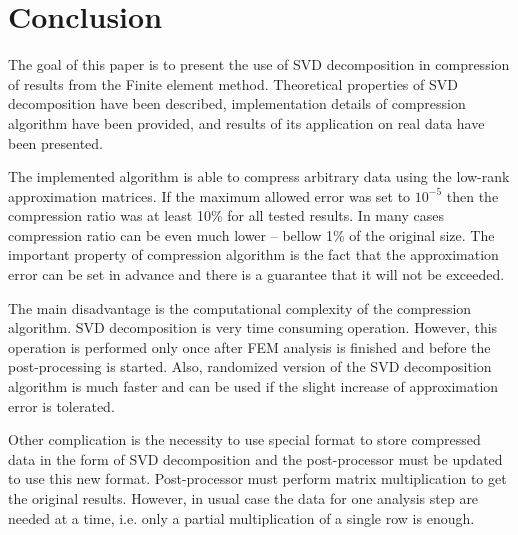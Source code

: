 \section{Conclusion}
\label{sec:conclusion}

The goal of this paper is to present the use of SVD decomposition in compression of results from the Finite element method. Theoretical properties of SVD decomposition have been described, implementation details of compression algorithm have been provided, and results of its application on real data have been presented.

The implemented algorithm is able to compress arbitrary data using the low-rank approximation matrices. If the maximum allowed error was set to $10^{-5}$ then the compression ratio was at least 10\% for all tested results. In many cases compression ratio can be even much lower -- bellow 1\% of the original size. The important property of compression algorithm is the fact that the approximation error can be set in advance and there is a guarantee that it will not be exceeded.

The main disadvantage is the computational complexity of the compression algorithm. SVD decomposition is very time consuming operation. However, this operation is performed only once after FEM analysis is finished and before the post-processing is started. Also, randomized version of the SVD decomposition algorithm is much faster and can be used if the slight increase of approximation error is tolerated. %

Other complication is the necessity to use special format to store compressed data in the form of SVD decomposition and the post-processor must be updated to use this new format. Post-processor must perform matrix multiplication to get the original results. However, in usual case the data for one analysis step are needed at a time, i.e. only a partial multiplication of a single row is enough.

